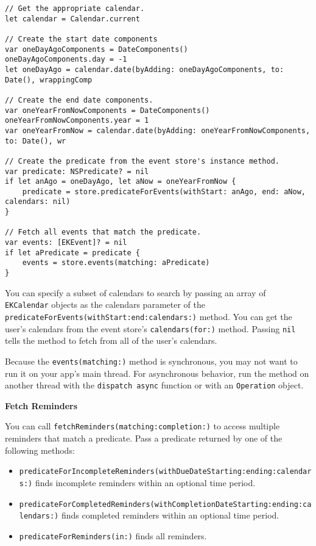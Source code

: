 \documentclass{article}
\begin{document}
\begin{verbatim}
// Get the appropriate calendar.
let calendar = Calendar.current

// Create the start date components
var oneDayAgoComponents = DateComponents()
oneDayAgoComponents.day = -1
let oneDayAgo = calendar.date(byAdding: oneDayAgoComponents, to: Date(), wrappingComp

// Create the end date components.
var oneYearFromNowComponents = DateComponents()
oneYearFromNowComponents.year = 1
var oneYearFromNow = calendar.date(byAdding: oneYearFromNowComponents, to: Date(), wr

// Create the predicate from the event store's instance method.
var predicate: NSPredicate? = nil
if let anAgo = oneDayAgo, let aNow = oneYearFromNow {
    predicate = store.predicateForEvents(withStart: anAgo, end: aNow, calendars: nil)
}

// Fetch all events that match the predicate.
var events: [EKEvent]? = nil
if let aPredicate = predicate {
    events = store.events(matching: aPredicate)
}
\end{verbatim}

You can specify a subset of calendars to search by passing an array of \texttt{EKCalendar} objects as the calendars parameter of the \texttt{predicateForEvents(withStart:end:calendars:)} method. You can get the user's calendars from the event store's \texttt{calendars(for:)} method. Passing \texttt{nil} tells the method to fetch from all of the user's calendars.

Because the \texttt{events(matching:)} method is synchronous, you may not want to run it on your app's main thread. For asynchronous behavior, run the method on another thread with the \texttt{dispatch async} function or with an \texttt{Operation} object.

\textbf{Fetch Reminders}

You can call \texttt{fetchReminders(matching:completion:)} to access multiple reminders that match a predicate. Pass a predicate returned by one of the following methods:

\begin{itemize}
    \item \texttt{predicateForIncompleteReminders(withDueDateStarting:ending:calendars:)} finds incomplete reminders within an optional time period.
    \item \texttt{predicateForCompletedReminders(withCompletionDateStarting:ending:calendars:)} finds completed reminders within an optional time period.
    \item \texttt{predicateForReminders(in:)} finds all reminders.
\end{itemize}
\end{document}
